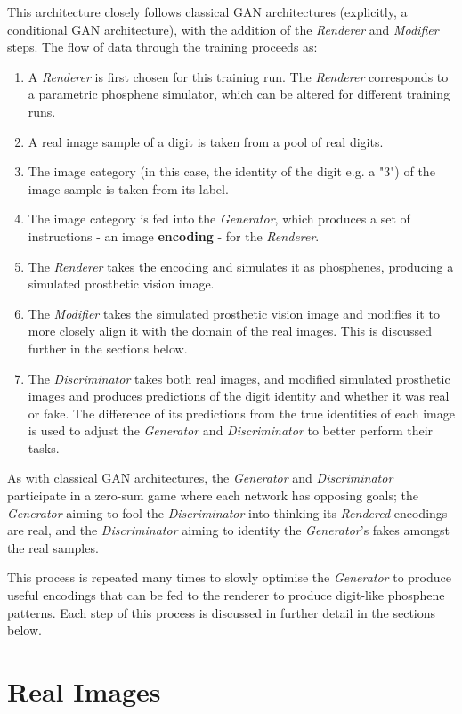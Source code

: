 \documentclass[a4paper,11pt,openany]{book}
\begin{document}
This architecture closely follows classical GAN architectures (explicitly, a conditional GAN architecture), with the addition of the \emph{Renderer} and \emph{Modifier} steps.
The flow of data through the training proceeds as:
\begin{enumerate}
\item A \emph{Renderer} is first chosen for this training run.
The \emph{Renderer} corresponds to a parametric phosphene simulator, which can be altered for different training runs.
\item A real image sample of a digit is taken from a pool of real digits.
\item The image category (in this case, the identity of the digit e.g. a "3") of the image sample is taken from its label.
\item The image category is fed into the \emph{Generator}, which produces a set of instructions - an image \textbf{encoding} - for the \emph{Renderer}.
\item The \emph{Renderer} takes the encoding and simulates it as phosphenes, producing a simulated prosthetic vision image.
\item The \emph{Modifier} takes the simulated prosthetic vision image and modifies it to more closely align it with the domain of the real images.
This is discussed further in the sections below.
\item The \emph{Discriminator} takes both real images, and modified simulated prosthetic images and produces predictions of the digit identity and whether it was real or fake.
The difference of its predictions from the true identities of each image is used to adjust the \emph{Generator} and \emph{Discriminator} to better perform their tasks.
\end{enumerate}

As with classical GAN architectures, the \emph{Generator} and \emph{Discriminator} participate in a zero-sum game where each network has opposing goals; the \emph{Generator} aiming to fool the \emph{Discriminator} into thinking its \emph{Rendered} encodings are real, and the \emph{Discriminator} aiming to identity the \emph{Generator}'s fakes amongst the real samples.

This process is repeated many times to slowly optimise the \emph{Generator} to produce useful encodings that can be fed to the renderer to produce digit-like phosphene patterns.
Each step of this process is discussed in further detail in the sections below.

\section*{Real Images}
\label{sec:org97bb631}
\end{document}
